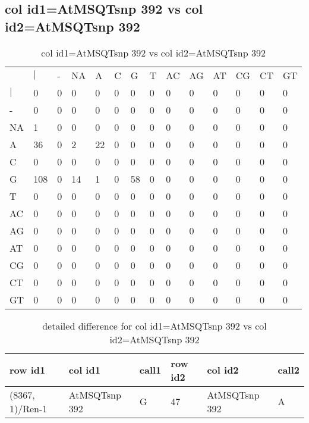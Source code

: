 \subsection{col id1=AtMSQTsnp 392 vs col id2=AtMSQTsnp 392}
\begin{center}
\begin{longtable}{|l|l|l|l|l|l|l|l|l|l|l|l|l|l|}
\caption{col id1=AtMSQTsnp 392 vs col id2=AtMSQTsnp 392} \label{table_dm702}\\
\hline
\\
\hline
&$|$&-&NA&A&C&G&T&AC&AG&AT&CG&CT&GT\\
$|$&0&0&0&0&0&0&0&0&0&0&0&0&0\\
-&0&0&0&0&0&0&0&0&0&0&0&0&0\\
NA&1&0&0&0&0&0&0&0&0&0&0&0&0\\
A&36&0&2&22&0&0&0&0&0&0&0&0&0\\
C&0&0&0&0&0&0&0&0&0&0&0&0&0\\
G&108&0&14&1&0&58&0&0&0&0&0&0&0\\
T&0&0&0&0&0&0&0&0&0&0&0&0&0\\
AC&0&0&0&0&0&0&0&0&0&0&0&0&0\\
AG&0&0&0&0&0&0&0&0&0&0&0&0&0\\
AT&0&0&0&0&0&0&0&0&0&0&0&0&0\\
CG&0&0&0&0&0&0&0&0&0&0&0&0&0\\
CT&0&0&0&0&0&0&0&0&0&0&0&0&0\\
GT&0&0&0&0&0&0&0&0&0&0&0&0&0\\
\hline
\end{longtable}
\end{center}

\begin{center}
\begin{longtable}{|l|l|l|l|l|l|}
\caption{detailed difference for col id1=AtMSQTsnp 392 vs col id2=AtMSQTsnp 392} \label{table_dm703}\\
\hline
row id1&col id1&call1&row id2&col id2&call2\\
\hline
(8367, 1)/Ren-1&AtMSQTsnp 392&G&47&AtMSQTsnp 392&A\\
\hline
\end{longtable}
\end{center}


